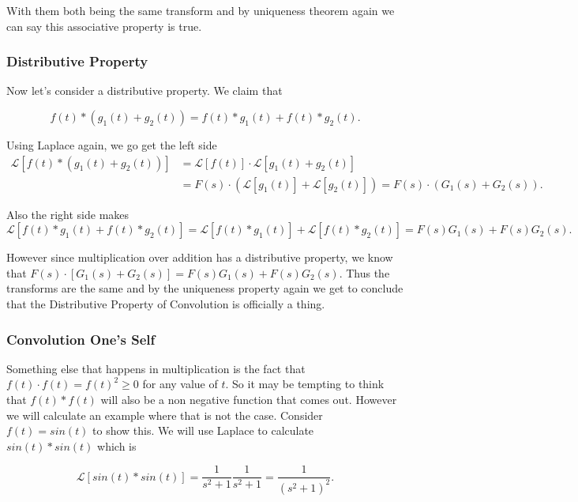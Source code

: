 \documentclass[12pt]{article}
\newcommand{\lp}{\mathscr{L}}
\begin{document}
With them both being the same transform and by uniqueness theorem again we can say this associative property is true.

\subsubsection{Distributive Property}

Now let's consider a distributive property. We claim that

\begin{equation*}
    f(t) \ast (g_1(t)+g_2(t)) = f(t) \ast g_1(t) + f(t) \ast g_2(t).
\end{equation*}

Using Laplace again, we go get the left side
\begin{align*}
    \lp[f(t) \ast (g_1(t)+g_2(t))] &= \lp[f(t)] \cdot \lp[g_1(t)+g_2(t)] \\
     &= F(s) \cdot (\lp[g_1(t)]+\lp[g_2(t)]) = F(s) \cdot (G_1(s)+G_2(s)).
\end{align*}

Also the right side makes
\begin{equation*}
    \lp[f(t) \ast g_1(t) + f(t) \ast g_2(t)] = \lp[f(t) \ast g_1(t)] + \lp[f(t) \ast g_2(t)] = F(s)G_1(s)+F(s)G_2(s).
\end{equation*}

However since multiplication over addition has a distributive property, we know that $F(s)\cdot [G_1(s)+G_2(s)]=F(s)G_1(s)+F(s)G_2(s)$. Thus the transforms are the same and by the uniqueness property again we get to conclude that the Distributive Property of Convolution is officially a thing.

\subsubsection{Convolution One's Self}

Something else that happens in multiplication is the fact that $f(t)\cdot f(t)=f(t)^2\geq0$ for any value of $t$. So it may be tempting to think that $f(t) \ast f(t)$ will also be a non negative function that comes out. However we will calculate an example where that is not the case. Consider $f(t)=sin(t)$ to show this. We will use Laplace to calculate $sin(t) \ast sin(t)$ which is

\begin{equation*}
    \lp[sin(t) \ast sin(t)]=\frac{1}{s^2+1}\frac{1}{s^2+1}=\frac{1}{(s^2+1)^2}.
\end{equation*}
\end{document}

